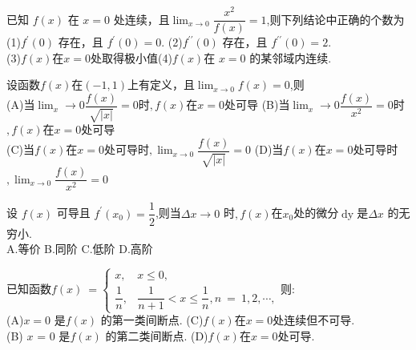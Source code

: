 \documentclass[8pt a4paper, oneside, UTF8]{ctexbook}  %
\begin{document}
\begin{sloppypar}
\begin{note}
    \end{note}
    \begin{problem}
        已知 $f(x)$ 在 $x=0$ 处连续，且$\lim_{x\to 0}\dfrac{x^2}{f(x)}=1$,则下列结论中正确的个数为\\
        (1)$f^{\prime}(0)$ 存在，且 $f^\prime(0)=0.$ \quad (2)$f^{\prime\prime}(0)$ 存在，且 $f^{\prime\prime}(0)=2.$\\
        (3)$f(x)$在$x=0$处取得极小值\quad (4)$f\left(x\right)$在 $x=0$ 的某邻域内连续.
    \end{problem}
    \begin{solution}
            
    \end{solution}
    \begin{note}
            
    \end{note}
    \begin{problem}
        设函数$f(x)$在$(-1,1)$上有定义，且$\lim_{x\to0}f(x)=0$,则\\
        (A)当$\lim_x\to0\dfrac{f(x)}{\sqrt{|x|}}=0$时$,f(x)$在$x=0$处可导
        (B)当$\lim_x\to0\dfrac{f(x)}{x^{2}}=0$时$,f(x)$在$x=0$处可导\\
        (C)当$f(x)$在$x=0$处可导时$,\lim_{x\to0}\dfrac{f(x)}{\sqrt{|x|}}=0$\quad
        (D)当$f(x)$在$x=0$处可导时$,\lim_{x\to0}\dfrac{f(x)}{x^{2}}=0$        
    \end{problem}
    \begin{solution}
            
    \end{solution}
    \begin{note}
            
    \end{note}
    \begin{problem}
        设 $f(x)$ 可导且 $f^\prime(x_0)=\dfrac12$,则当$\Delta x\to0$ 时$,f(x)$在$x_0$处的微分$\operatorname{dy}$是$\Delta x$ 的无穷小.\\
        A.等价 \quad B.同阶 \quad C.低阶 \quad D.高阶
    \end{problem}
    \begin{solution}
            
    \end{solution}
    \begin{note}
            
    \end{note}
    \begin{problem}
        已知函数$f(x)\:=\begin{cases}x,&x\leqslant0,\\\dfrac{1}{n},&\dfrac{1}{n+1}<x\leq\dfrac{1}{n},n\:=\:1,2,\cdots,\end{cases}$则:\\
        (A)$x=0$ 是$f(x)$ 的第一类间断点. \quad
        (C)$f(x)$在$x=0$处连续但不可导.\\
        (B) $x$ = 0 是$f(x)$ 的第二类间断点.\quad
        (D)$f(x)$在$x=0$处可导.
    \end{problem}
    \begin{solution}
            

\end{solution}
\end{sloppypar}
\end{document}
